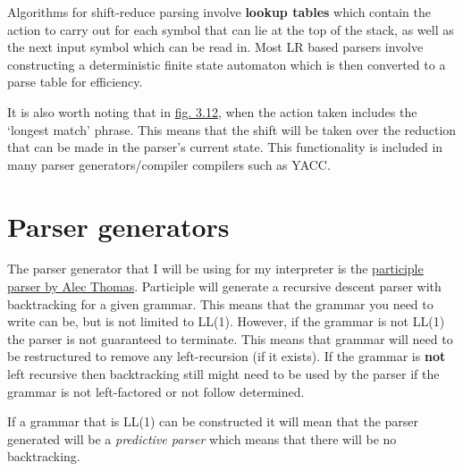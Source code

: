 Algorithms for shift-reduce parsing involve \textbf{lookup tables} which contain the action to carry out for each symbol that can lie at the top of the stack, as well as the next input symbol which can be read in. Most LR based parsers involve constructing a deterministic finite state automaton which is then converted to a parse table for efficiency.\textsuperscript{\cite{hopcroft_motwani_ullman_2006}}

It is also worth noting that in \hyperref[fig:3.12]{fig. 3.12}, when the action taken includes the `longest match' phrase. This means that the shift will be taken over the reduction that can be made in the parser's current state. This functionality is included in many parser generators/compiler compilers such as YACC.

\section{Parser generators}

The parser generator that I will be using for my interpreter is the \href{https://github.com/alecthomas/participle#overview}{participle parser by Alec Thomas}. Participle will generate a recursive descent parser with backtracking for a given grammar. This means that the grammar you need to write can be, but is not limited to LL(1). However, if the grammar is not LL(1) the parser is not guaranteed to terminate. This means that grammar will need to be restructured to remove any left-recursion (if it exists). If the grammar is \textbf{not} left recursive then backtracking still might need to be used by the parser if the grammar is not left-factored or not follow determined.

If a grammar that is LL(1) can be constructed it will mean that the parser generated will be a \textit{predictive parser} which means that there will be no backtracking.
